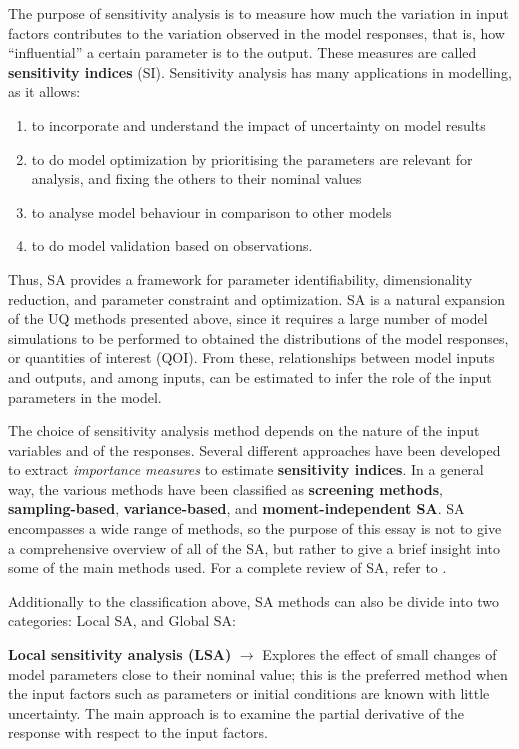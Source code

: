 \documentclass[12pt]{article}
\begin{document}
The purpose of sensitivity analysis is to measure how much the variation in input factors contributes to the variation observed in the model responses, that is, how ``influential'' a certain parameter is to the output. These measures are called \textbf{sensitivity indices} (SI). Sensitivity analysis has many applications in modelling,  as it allows: 
\begin{enumerate}
	\item to incorporate and understand the impact of uncertainty on model results
	\item  to do model optimization by prioritising the parameters are relevant for analysis, and fixing the others to their nominal values
	\item  to analyse model behaviour in comparison to other models
	\item to do model validation based on observations.  
\end{enumerate}
Thus, SA provides a framework for parameter identifiability, dimensionality reduction, and parameter constraint and optimization.  SA is a natural expansion of the UQ methods presented above, since it requires a large number of model simulations to be performed to obtained the distributions of the model responses, or quantities of interest (QOI). From these, relationships between model inputs and outputs, and among inputs, can be estimated to infer the role of the input parameters in the model. 

The choice of sensitivity analysis method depends on the nature of the input variables and of the responses. Several different approaches have been developed to extract \textit{importance measures} to estimate \textbf{sensitivity indices}. In a general way, the various methods have been classified as \textbf{screening methods}, \textbf{sampling-based}, \textbf{variance-based}, and \textbf{moment-independent SA}. 
SA encompasses a wide range of methods, so the purpose of this essay is not to give a comprehensive overview of all of the SA, but rather to give a brief insight into some of the main methods used. For a complete review of SA, refer to \cite{SaltelliThePrimer}. 


Additionally to the classification above, SA methods can also be divide into two categories: Local SA, and Global SA:

\textbf{Local sensitivity analysis (LSA)} $\rightarrow$ Explores the effect of small changes of model parameters  close to their nominal value; this is the preferred method when the input factors such as parameters or initial conditions are known with little uncertainty. The main approach is to examine the partial derivative of the response with respect to the input factors. 
\end{document}
